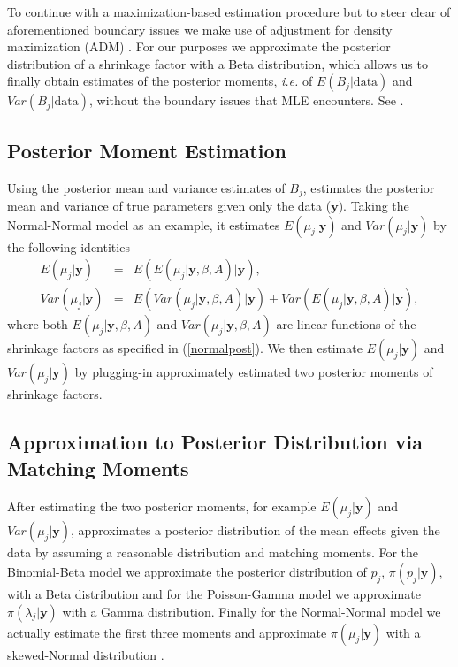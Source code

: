 \documentclass[article]{jss}
\begin{document}
To continue with a maximization-based estimation procedure but to steer clear of aforementioned boundary issues we make use of adjustment for density maximization (ADM) \citep{carl1988, 1997, 2011}. For our purposes we approximate the posterior distribution of a shrinkage factor with a Beta distribution, which allows us to finally obtain estimates of the posterior moments, \emph{i.e.}  of $E(B_{j}\vert\textrm{data})$ and $Var(B_{j}\vert\textrm{data})$, without the boundary issues that MLE encounters. See \cite{2011}.

\subsection[Posterior Moment Estimation]{Posterior Moment Estimation}

Using the posterior mean and variance estimates of $B_{j}$,  estimates the posterior mean and variance of true parameters given only the data ($\textbf{y}$). Taking the Normal-Normal model as an example, it estimates $E(\mu_{j}\vert \textbf{y})$ and $Var(\mu_{j}\vert \textbf{y})$ by the following identities
\begin{eqnarray}
E(\mu_{j}\vert \textbf{y}) & = & E(E(\mu_{j}\vert \textbf{y}, \beta, A)\vert \textbf{y}), \\
Var(\mu_{j}\vert \textbf{y}) & = & E(Var(\mu_{j}\vert \textbf{y}, \beta, A)\vert \textbf{y})+Var(E(\mu_{j}\vert \textbf{y}, \beta, A)\vert \textbf{y}),
\end{eqnarray}  
where both $E(\mu_{j}\vert \textbf{y}, \beta, A)$ and $Var(\mu_{j}\vert \textbf{y}, \beta, A)$ are linear functions of the shrinkage factors as specified in (\ref{normalpost}). We then estimate $E(\mu_{j}\vert \textbf{y})$ and $Var(\mu_{j}\vert \textbf{y})$ by plugging-in approximately estimated two posterior moments of shrinkage factors.

\subsection[Approximation to Posterior Distribution by Moment Matching]{Approximation to Posterior Distribution via Matching Moments}
After estimating the two posterior moments, for example $E(\mu_{j}\vert \textbf{y})$ and $Var(\mu_{j}\vert \textbf{y})$,  approximates a posterior distribution of the mean effects given the data by assuming a reasonable distribution and matching moments. For the Binomial-Beta model we approximate the posterior distribution of $p_{j}$, $\pi(p_{j}\vert \textbf{y})$, with a Beta distribution and for the Poisson-Gamma model we approximate $\pi(\lambda_{j}\vert \textbf{y})$ with a Gamma distribution. Finally for the Normal-Normal model we actually estimate the first three moments and approximate $\pi(\mu_{j}\vert \textbf{y})$ with a skewed-Normal distribution \citep{sn2013}. 
\end{document}
